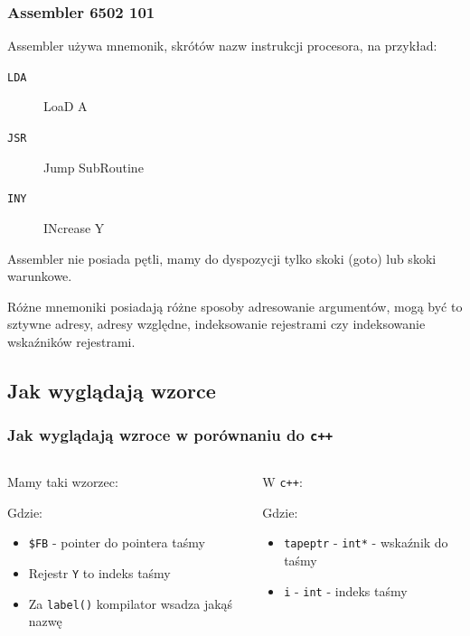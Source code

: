 \documentclass[aspectratio=169]{beamer}
\begin{document}
\begin{frame}
    \frametitle{Assembler 6502 101}
    Assembler używa mnemonik, skrótów nazw instrukcji procesora, na przykład:\pause
    \begin{description}
        \item[\texttt{LDA}] LoaD A
        \item[\texttt{JSR}] Jump SubRoutine
        \item[\texttt{INY}] INcrease Y
    \end{description}
    \pause
    Assembler nie posiada pętli, mamy do dyspozycji tylko skoki (goto) lub skoki warunkowe.

    \pause\vspace{5mm}

    Różne mnemoniki posiadają różne sposoby adresowanie argumentów, mogą być to sztywne adresy, adresy względne, indeksowanie rejestrami czy indeksowanie wskaźników rejestrami.
\end{frame}
\begin{frame}[fragile]
    
\end{frame}

\subsection{Jak wyglądają wzorce}
\begin{frame}
    \frametitle{Jak wyglądają wzroce w porównaniu do \texttt{c++}}
    \begin{columns}
        \begin{column}{0.6\textwidth}
            Mamy taki wzorzec:
            
            \footnotesize{
                Gdzie:
                \begin{itemize}
                    \item \texttt{\$FB} - pointer do pointera taśmy
                    \item Rejestr \texttt{Y} to indeks taśmy
                    \item Za \texttt{label()} kompilator wsadza jakąś nazwę
                \end{itemize}
                \pause
            }
        \end{column}
        \begin{column}{0.4\textwidth}
            W \texttt{c++}:
            
            \footnotesize{
                Gdzie:
                \begin{itemize}
                    \item \texttt{tapeptr} - \texttt{int*} - wskaźnik do taśmy
                    \item \texttt{i} - \texttt{int} - indeks taśmy
                \end{itemize}
            }
        \end{column}
    \end{columns}
\end{frame}
\end{document}
